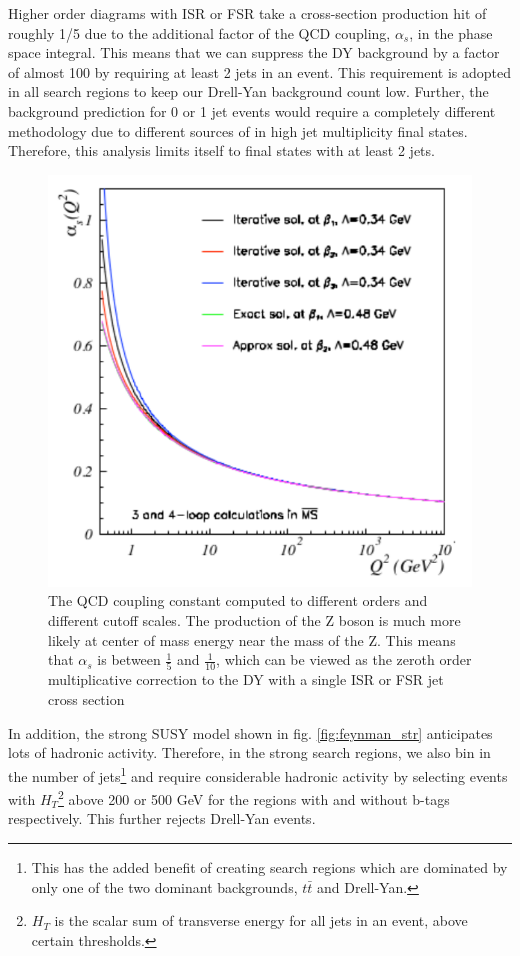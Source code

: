       Higher order diagrams with ISR or FSR take a cross-section production hit of roughly 1/5 due to the additional factor of the QCD coupling, $\alpha_s$, in the phase space integral. This means that we can suppress the DY background by a factor of almost 100 by requiring at least 2 jets in an event. This requirement is adopted in all search regions to keep our Drell-Yan background count low. Further, the background prediction for 0 or 1 jet events would require a completely different methodology due to different sources of \MET in high jet multiplicity final states. Therefore, this analysis limits itself to final states with at least 2 jets. 

      \begin{figure}[h!]
        \centering
        \includegraphics[width=.5\textwidth]{figures/QCD_Coupling_Running.pdf}
        \caption{The QCD coupling constant computed to different orders and different cutoff scales. The production of the Z boson is much more likely at center of mass energy near the mass of the Z. This means that $\alpha_s$ is between $\frac{1}{5}$ and $\frac{1}{10}$, which can be viewed as the zeroth order multiplicative correction to the DY with a single ISR or FSR jet cross section} 
        \label{fig:alpha_s_running}
      \end{figure}

      In addition, the strong SUSY model shown in fig. \ref{fig:feynman_str} anticipates lots of hadronic activity. Therefore, in the strong search regions, we also bin in the number of jets\footnote{This has the added benefit of creating search regions which are dominated by only one of the two dominant backgrounds, $t\bar{t}$ and Drell-Yan.} and require considerable hadronic activity by selecting events with $H_T$\footnote{$H_T$ is the scalar sum of transverse energy for all jets in an event, above certain thresholds.} above 200 or 500 GeV for the regions with and without b-tags respectively. This further rejects Drell-Yan events.



